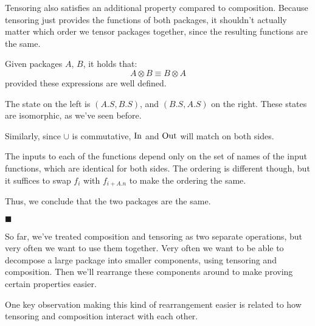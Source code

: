 Tensoring also satisfies an additional property compared to composition.
Because tensoring just provides the functions of both packages,
it shouldn't actually matter which order we tensor packages together,
since the resulting functions are the same.

\begin{lemma}
    Given packages $A$, $B$, it holds that:
    $$
    A \otimes B \equiv B \otimes A
    $$
    provided these expressions are well defined.

     The state on the left is $(A.S, B.S)$, and $(B.S, A.S)$
    on the right.
    These states are isomorphic, as we've seen before.

    Similarly, since $\cup$ is commutative, $\text{In}$ and $\text{Out}$
    will match on both sides.

    The inputs to each of the functions depend only on the set
    of names of the input functions, which are identical for both sides.
    The ordering is different though, but it suffices
    to swap $f_i$ with $f_{i + A.n}$ to make the ordering the same.

    Thus, we conclude that the two packages are the same.

    $\blacksquare$
\end{lemma}

So far, we've treated composition and tensoring as two separate operations,
but very often we want to use them together.
Very often we want to be able to decompose a large package
into smaller components, using tensoring and composition.
Then we'll rearrange these components around to make proving
certain properties easier.

One key observation making this kind of rearrangement easier
is related to how tensoring and composition interact with each other.

